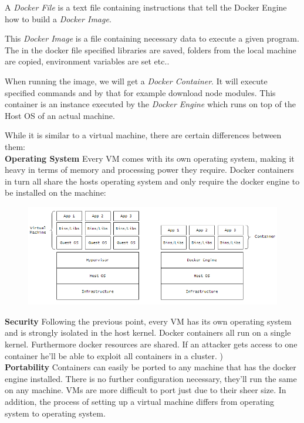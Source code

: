 A \emph{Docker File} is a text file containing instructions that tell the Docker Engine how to build a \emph{Docker Image}. \cite{NickDocker}

This \emph{Docker Image} is a file containing necessary data to execute a given program. The in the docker file specified libraries are saved, folders from the local machine are copied, environment variables are set etc.. 

When running the image, we will get a \emph{Docker Container}. It will execute specified commands and by that for example download node modules. This container is an instance executed by the \emph{Docker Engine} which runs on top of the Host OS of an actual machine.

\newpage
While it is similar to a virtual machine, there are certain differences between them: \\
\textbf{Operating System} Every VM comes with its own operating system, making it heavy in terms of memory and processing power they require. Docker containers in turn all share the hosts operating system and only require the docker engine to be installed on the machine: \cite{GeekDocker}
\begin{figure}[H]
\centering
\includegraphics[scale=.8]{Bilder/DockerVsVM.png}
\label{ex312}
\end{figure}
\noindent
\textbf{Security} Following the previous point, every VM has its own operating system and is strongly isolated in the host kernel. Docker containers all run on a single kernel. Furthermore docker resources are shared. If an attacker gets access to one container he'll be able to exploit  all containers in a cluster. \cite{GeekDocker}) \\
\textbf{Portability} Containers can easily be ported to any machine that has the docker engine installed. There is no further configuration necessary, they'll run the same on any machine. VMs are more difficult to port just due to their sheer size. In addition, the process of setting up a virtual machine differs from operating system to operating system. 

